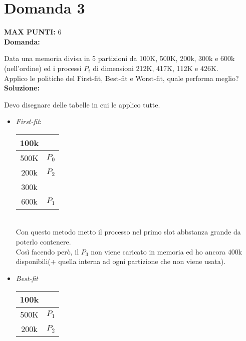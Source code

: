 \documentclass{article}
\begin{document}
    \section*{Domanda 3}
    \textbf{MAX PUNTI:} 6\\
    \textbf{Domanda:}


    Data una memoria divisa in 5 partizioni da 100K, 500K, 200k, 300k e 600k (nell'ordine) ed i processi $P_i$ di dimensioni 212K, 417K, 112K e 426K.\\
    Applico le politiche del First-fit, Best-fit e Worst-fit, quale performa meglio?\\
    \textbf{Soluzione:}


    Devo disegnare delle tabelle in cui le applico tutte.
    \begin{itemize}
        \item \emph{First-fit}:
            \begin{minipage}[c]{0.3\textwidth}
                \begin{tabular}{|c|c|}
                    \hline
                    100k & \\
                    \hline
                    500K & $P_0$\\
                    \hline
                    200k & $P_2$\\
                    \hline
                    300k & \\
                    \hline
                    600k & $P_1$\\
                    \hline
                \end{tabular}
            \end{minipage}\\
            Con questo metodo metto il processo nel primo slot abbstanza grande da poterlo contenere.\\
            Così facendo però, il $P_3$ non viene caricato in memoria ed ho ancora 400k disponibili(+ quella interna ad ogni partizione che non viene usata).
        \item \emph{Best-fit}
            \begin{minipage}[c]{0.3\textwidth}
                \begin{tabular}{|c|c|}
                    \hline
                    100k & \\
                    \hline
                    500K & $P_1$\\
                    \hline
                    200k & $P_2$\\

\end{tabular}
\end{minipage}
\end{itemize}
\end{document}
